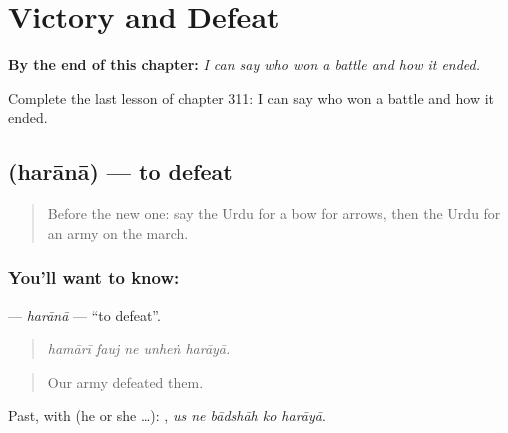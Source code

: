 
\chapter{Victory and Defeat}
\label{ch:ur-victory-and-defeat}

\begin{chapteropening}
\textbf{By the end of this chapter:} \emph{I can say who won a battle and how it ended.}

Complete the last lesson of chapter 311: I can say who won a battle and how it ended.
\end{chapteropening}

\section[\texorpdfstring{\ur{ہرانا} (harānā)}{ہرانا (harānā)}]{ (harānā) — to defeat}

\label{lesson:UR-C311-harana}



\begin{quote}
Before the new one: say the Urdu for a bow for arrows, then the Urdu for an army on the march.
\end{quote}

\subsection*{You'll want to know: }
\textbf{} — \emph{harānā} — \textquotedblleft{}to defeat\textquotedblright{}.

\begin{quote}
    
\end{quote}

\begin{quote}
\emph{hamārī fauj ne unheṅ harāyā.}
\end{quote}

\begin{quote}
Our army defeated them.
\end{quote}

Past, with  (he or she …):     , \emph{us ne bādshāh ko harāyā}.

